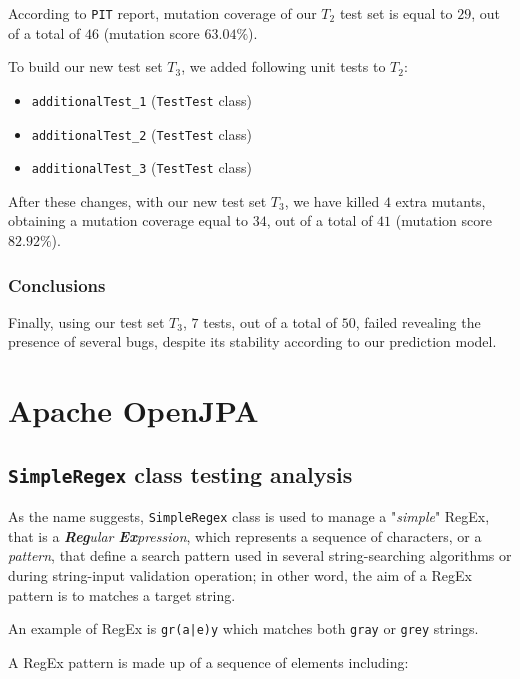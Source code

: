 \documentclass[sigconf]{acmart}
\begin{document}
According to \texttt{PIT} report, mutation coverage of our $T_2$ test set is equal to $29$, out of a total of $46$ (mutation score $63.04 \%$). 

To build our new test set $T_3$, we added following unit tests to $T_2$:

\begin{itemize}
\item \texttt{additionalTest\_1} (\texttt{TestTest} class)
\item \texttt{additionalTest\_2} (\texttt{TestTest} class)
\item \texttt{additionalTest\_3} (\texttt{TestTest} class)
\end{itemize}

After these changes, with our new test set $T_3$, we have killed $4$ extra mutants, obtaining a mutation coverage equal to $34$, out of a total of $41$ (mutation score $82.92 \%$).

\subsubsection{Conclusions}

Finally, using our test set $T_3$, $7$ tests, out of a total of $50$, failed revealing the presence of several bugs, despite its stability according to our prediction model.

\newpage
\section{Apache OpenJPA\texttrademark}

\subsection{\texttt{SimpleRegex} class testing analysis}

As the name suggests, \texttt{SimpleRegex} class is used to manage a "\textit{simple}" RegEx, that is a \textit{\textbf{Reg}ular \textbf{Ex}pression}, which represents a sequence of characters, or a \textit{pattern}, that define a search pattern used in several string-searching algorithms or during string-input validation operation; in other word, the aim of a RegEx pattern is to matches a target string.

An example of RegEx is \colorbox{beaublue}{\texttt{gr(a|e)y}} which matches both \colorbox{beaublue}{\texttt{gray}} or \colorbox{beaublue}{\texttt{grey}} strings.

A RegEx pattern is made up of a sequence of elements including:
\end{document}

